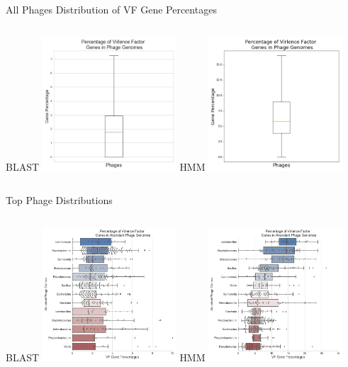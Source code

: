 \documentclass[11pt]{beamer}
\begin{document}
	
	\begin{frame}{All Phages Distribution of VF Gene Percentages}
	\begin{columns}
	\large{BLAST}
	\includegraphics[height=5cm, width=5cm]{All_Phages_BLAST_Percentage.jpg}
	\large{HMM}
	\includegraphics[height=5cm, width=5cm]{All_Phages_Percentage.jpg}
	\end{columns}
	\end{frame}
	
	\begin{frame}{Top Phage Distributions}
	\begin{columns}
	\column{0.5\textwidth}
	\large{BLAST}
	\includegraphics[height=5cm, width=5cm]{Top_Phages_Percentage_BLAST.jpg}
	\column{0.5\textwidth}
	\large{HMM}
	\includegraphics[height=5cm, width=5cm]{Top_Phages_Percentage_HMM.jpg}
	\end{columns}
	\end{frame}
	
\end{document}
